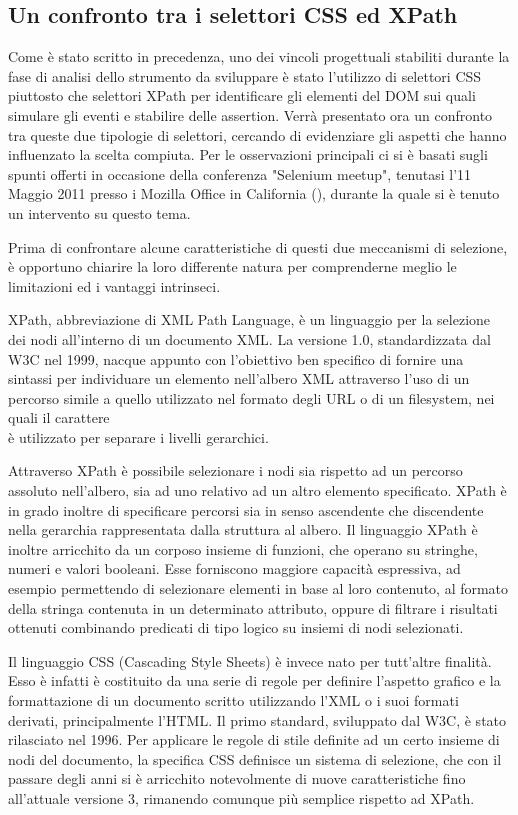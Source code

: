 \subsection{Un confronto tra i selettori CSS ed XPath}

Come è stato scritto in precedenza, uno dei vincoli progettuali stabiliti durante la fase di analisi dello strumento da sviluppare è stato l'utilizzo di selettori CSS piuttosto che selettori XPath per identificare gli elementi del DOM sui quali simulare gli eventi e stabilire delle assertion. Verrà presentato ora un confronto tra queste due tipologie di selettori, cercando di evidenziare gli aspetti che hanno influenzato la scelta compiuta. Per le osservazioni principali ci si è basati sugli spunti offerti in occasione della conferenza "Selenium meetup", tenutasi l'11 Maggio 2011 presso i Mozilla Office in California (\cite{suarezCss}), durante la quale si è tenuto un intervento su questo tema.

Prima di confrontare alcune caratteristiche di questi due meccanismi di selezione, è opportuno chiarire la loro differente natura per comprenderne meglio le limitazioni ed i vantaggi intrinseci.

XPath, abbreviazione di XML Path Language, è un linguaggio per la selezione dei nodi all'interno di un documento XML. La versione 1.0, standardizzata dal W3C nel 1999, nacque appunto con l'obiettivo ben specifico di fornire una sintassi per individuare un elemento nell'albero XML attraverso l'uso di un percorso simile a quello utilizzato nel formato degli URL o di un filesystem, nei quali il carattere \\ è utilizzato per separare i livelli gerarchici. 

Attraverso XPath è possibile selezionare i nodi sia rispetto ad un percorso assoluto nell'albero, sia ad uno relativo ad un altro elemento specificato. XPath è in grado inoltre di specificare percorsi sia in senso ascendente che discendente nella gerarchia rappresentata dalla struttura al albero. Il linguaggio XPath è inoltre arricchito da un corposo insieme di funzioni, che operano su stringhe, numeri e valori booleani. Esse forniscono maggiore capacità espressiva, ad esempio permettendo di selezionare elementi in base al loro contenuto, al formato della stringa contenuta in un determinato attributo, oppure di filtrare i risultati ottenuti combinando predicati di tipo logico su insiemi di nodi selezionati.

Il linguaggio CSS (Cascading Style Sheets) è invece nato per tutt'altre finalità. Esso è infatti è costituito da una serie di regole per definire l'aspetto grafico e la formattazione di un documento scritto utilizzando l'XML o i suoi formati derivati, principalmente l'HTML. Il primo standard, sviluppato dal W3C, è stato rilasciato nel 1996. Per applicare le regole di stile definite ad un certo insieme di nodi del documento, la specifica CSS definisce un sistema di selezione, che con il passare degli anni si è arricchito notevolmente di nuove caratteristiche fino all'attuale versione 3, rimanendo comunque più semplice rispetto ad XPath. 

